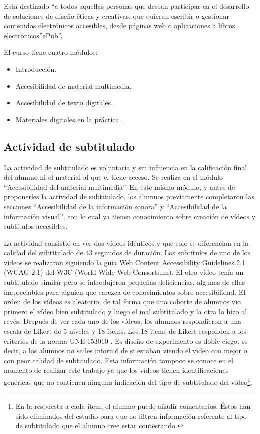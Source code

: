 \documentclass[
  12pt,
  a4paper,
  extrafontsizes,
  onecolumn,
  openright]{memoir}
\providecommand{\tightlist}{%
  \setlength{\itemsep}{0pt}\setlength{\parskip}{0pt}}\usepackage{longtable,booktabs,array}
\begin{document}
Está destinado \enquote{a todos aquellas personas que desean participar
en el desarrollo de soluciones de diseño éticas y creativas, que quieran
escribir o gestionar contenidos electrónicos accesibles, desde páginas
web o aplicaciones a libros electrónicos}ePub''.

El curso tiene cuatro módulos:

\begin{itemize}
\tightlist
\item
  Introducción.
\item
  Accesibilidad de material multimedia.
\item
  Accesibilidad de texto digitales.
\item
  Materiales digitales en la práctica.
\end{itemize}

\hypertarget{actividad-de-subtitulado}{%
\subsection{Actividad de subtitulado}\label{actividad-de-subtitulado}}

La actividad de subtitulado es voluntaria y sin influencia en la
calificación final del alumno ni el material al que el tiene acceso. Se
realiza en el módulo \enquote{Accesibilidad del material multimedia}. En
este mismo módulo, y antes de proponerles la actividad de subtitulado,
los alumnos previamente completaron las secciones \enquote{Accesibilidad
de la información sonora} y \enquote{Accesibilidad de la información
visual}, con lo cual ya tienen conocimiento sobre creación de vídeos y
subtítulos accesibles.

La actividad consistió en ver dos vídeos idénticos y que solo se
diferencian en la calidad del subtitulado de 43 segundos de duración.
Los subtítulos de uno de los vídeos se realizaron
\autocites[ver][]{jperez1,jperez2} siguiendo la guía Web Content
Accessibility Guidelines 2.1 (WCAG 2.1) del W3C (World Wide Web
Consortium). El otro vídeo tenía un subtitulado similar pero se
introdujeron pequeñas deficiencias, algunas de ellas inapreciables para
alguien que carezca de conocimientos sobre accesibilidad. El orden de
los vídeos es aleatorio, de tal forma que una cohorte de alumnos vio
primero el vídeo bien subtitulado y luego el mal subtitulado y la otra
lo hizo al revés. Después de ver cada uno de los vídeos, los alumnos
respondieron a una escala de Likert de 5 niveles y 18 ítems. Los 18
items de Likert responden a los criterios de la norma UNE 153010
\autocite[ver][]{aenor2012}. Es diseño de experimento es doble ciego: es
decir, a los alumnos no se les informó de si estaban viendo el vídeo con
mejor o con peor calidad de subtitulado. Esta información tampoco se
conoce en el momento de realizar este trabajo ya que los vídeos tienen
identificaciones genéricas que no contienen ninguna indicación del tipo
de subtitulado del vídeo\footnote{En la respuesta a cada ítem, el alumno
  puede añadir comentarios. Éstos han sido eliminados del estudio para
  que no filtren información referente al tipo de subtitulado que el
  alumno cree estar contestando.}.
\end{document}
